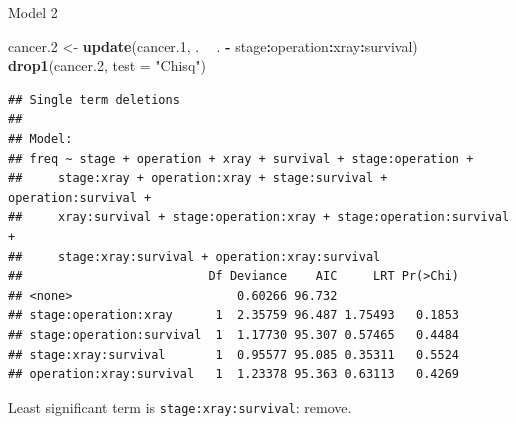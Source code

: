 \documentclass[ignorenonframetext,]{beamer}
\newenvironment{Shaded}{\begin{snugshade}}{\end{snugshade}}
\newcommand{\DataTypeTok}[1]{\textcolor[rgb]{0.13,0.29,0.53}{#1}}
\newcommand{\FloatTok}[1]{\textcolor[rgb]{0.00,0.00,0.81}{#1}}
\newcommand{\KeywordTok}[1]{\textcolor[rgb]{0.13,0.29,0.53}{\textbf{#1}}}
\newcommand{\NormalTok}[1]{#1}
\newcommand{\OperatorTok}[1]{\textcolor[rgb]{0.81,0.36,0.00}{\textbf{#1}}}
\newcommand{\StringTok}[1]{\textcolor[rgb]{0.31,0.60,0.02}{#1}}
\begin{document}
\begin{frame}[fragile]{Model 2}
\protect\hypertarget{model-2-1}{}

\scriptsize

\begin{Shaded}
\begin{Highlighting}[]
\NormalTok{cancer}\FloatTok{.2}\NormalTok{ <-}\StringTok{ }\KeywordTok{update}\NormalTok{(cancer}\FloatTok{.1}\NormalTok{, . }\OperatorTok{~}\StringTok{ }\NormalTok{. }\OperatorTok{-}\StringTok{ }\NormalTok{stage}\OperatorTok{:}\NormalTok{operation}\OperatorTok{:}\NormalTok{xray}\OperatorTok{:}\NormalTok{survival)}
\KeywordTok{drop1}\NormalTok{(cancer}\FloatTok{.2}\NormalTok{, }\DataTypeTok{test =} \StringTok{"Chisq"}\NormalTok{)}
\end{Highlighting}
\end{Shaded}

\begin{verbatim}
## Single term deletions
## 
## Model:
## freq ~ stage + operation + xray + survival + stage:operation + 
##     stage:xray + operation:xray + stage:survival + operation:survival + 
##     xray:survival + stage:operation:xray + stage:operation:survival + 
##     stage:xray:survival + operation:xray:survival
##                          Df Deviance    AIC     LRT Pr(>Chi)
## <none>                       0.60266 96.732                 
## stage:operation:xray      1  2.35759 96.487 1.75493   0.1853
## stage:operation:survival  1  1.17730 95.307 0.57465   0.4484
## stage:xray:survival       1  0.95577 95.085 0.35311   0.5524
## operation:xray:survival   1  1.23378 95.363 0.63113   0.4269
\end{verbatim}

\normalsize

Least significant term is \texttt{stage:xray:survival}: remove.

\end{frame}
\end{document}
